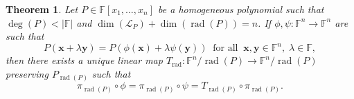 \documentclass[10pt,a4paper]{amsart}
\newtheorem{theorem}{Theorem}
\def\F{{\mathbb F}}
\DeclareMathOperator{\rad}{rad}
\begin{document}
\begin{theorem}\label{thm:homogenphipsi}Let $P \in \F[x_1,\ldots, x_n]$ be a homogeneous polynomial such that $\deg (P) < |\F|$ and $\dim (\mathcal L_P) + \dim (\rad(P)) = n$.  If  $\phi, \psi \colon \F^n \to \F^n$ are such that
\begin{equation}\label{thm:homogenphipsi:eqq1}
P(\mathbf{x} + \lambda \mathbf{y}) = P(\phi(\mathbf{x}) + \lambda \psi(\mathbf{y}))\;\;\mbox{for all}\;\;\mathbf{x},\mathbf{y} \in \mathbb \F^n,\; \lambda \in \F,
\end{equation}
then there exists a unique linear map $T_{\rad} \colon \F^n/\rad(P) \to \F^n/\rad(P)$ preserving $P_{\rad(P)}$ such that
\begin{equation*}\label{thm:homogenphipsi:eq}
\pi_{\rad(P)} \circ \phi = \pi_{\rad(P)} \circ \psi = T_{\rad(P)} \circ \pi_{\rad(P)}. 
\end{equation*}
\end{theorem} 
\end{document}
